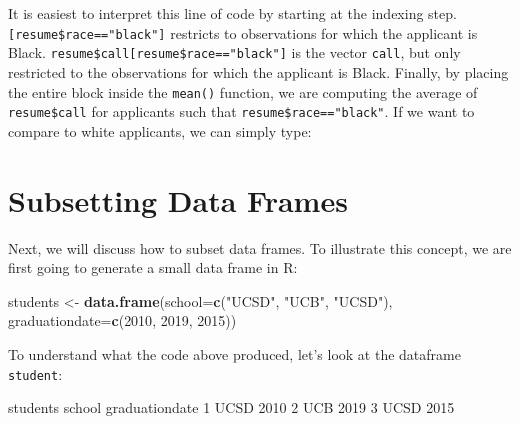 \documentclass[
]{book}
\newenvironment{Shaded}{\begin{snugshade}}{\end{snugshade}}
\newcommand{\AttributeTok}[1]{\textcolor[rgb]{0.13,0.29,0.53}{#1}}
\newcommand{\DecValTok}[1]{\textcolor[rgb]{0.00,0.00,0.81}{#1}}
\newcommand{\FloatTok}[1]{\textcolor[rgb]{0.00,0.00,0.81}{#1}}
\newcommand{\FunctionTok}[1]{\textcolor[rgb]{0.13,0.29,0.53}{\textbf{#1}}}
\newcommand{\NormalTok}[1]{#1}
\newcommand{\OtherTok}[1]{\textcolor[rgb]{0.56,0.35,0.01}{#1}}
\newcommand{\SpecialCharTok}[1]{\textcolor[rgb]{0.81,0.36,0.00}{\textbf{#1}}}
\newcommand{\StringTok}[1]{\textcolor[rgb]{0.31,0.60,0.02}{#1}}
\begin{document}
It is easiest to interpret this line of code by starting at the indexing step. \texttt{{[}resume\$race=="black"{]}} restricts to observations for which the applicant is Black. \texttt{resume\$call{[}resume\$race=="black"{]}} is the vector \texttt{call}, but only restricted to the observations for which the applicant is Black. Finally, by placing the entire block inside the \texttt{mean()} function, we are computing the average of \texttt{resume\$call} for applicants such that \texttt{resume\$race=="black"}. If we want to compare to white applicants, we can simply type:

\begin{Shaded}
\end{Shaded}

\section{Subsetting Data Frames}\label{subsetting-data-frames}

Next, we will discuss how to subset data frames. To illustrate this concept, we are first going to generate a small data frame in R:

\begin{Shaded}
\begin{Highlighting}[]
\NormalTok{students }\OtherTok{\textless{}{-}} \FunctionTok{data.frame}\NormalTok{(}\AttributeTok{school=}\FunctionTok{c}\NormalTok{(}\StringTok{"UCSD"}\NormalTok{, }\StringTok{"UCB"}\NormalTok{, }\StringTok{"UCSD"}\NormalTok{),}
                       \AttributeTok{graduationdate=}\FunctionTok{c}\NormalTok{(}\DecValTok{2010}\NormalTok{, }\DecValTok{2019}\NormalTok{, }\DecValTok{2015}\NormalTok{))}
\end{Highlighting}
\end{Shaded}

To understand what the code above produced, let's look at the dataframe \texttt{student}:

\begin{Shaded}
\begin{Highlighting}[]
\NormalTok{students}
\NormalTok{  school graduationdate}
\DecValTok{1}\NormalTok{   UCSD           }\DecValTok{2010}
\DecValTok{2}\NormalTok{    UCB           }\DecValTok{2019}
\DecValTok{3}\NormalTok{   UCSD           }\DecValTok{2015}
\end{Highlighting}
\end{Shaded}
\end{document}
